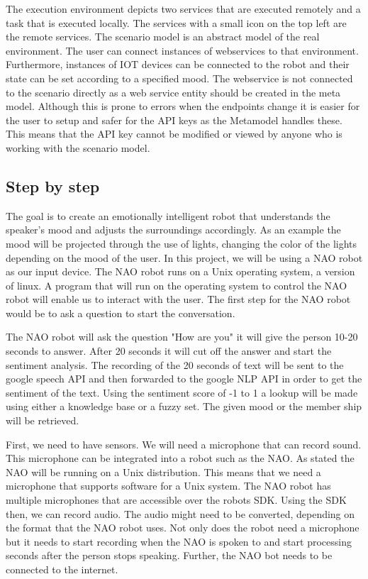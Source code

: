 \documentclass{lncs}
\begin{document}
The execution environment depicts two services that are executed remotely and a task that is executed locally. The services with a small icon on the top left are the remote services. The scenario model is an abstract model of the real environment. The user can connect instances of webservices to that environment. Furthermore, instances of IOT devices can be connected to the robot and their state can be set according to a specified mood. The webservice is not connected to the scenario directly as a web service entity should be created in the meta model. Although this is prone to errors when the endpoints change it is easier for the user to setup and safer for the API keys as the Metamodel handles these. This means that the API key cannot be modified or viewed by anyone who is working with the scenario model.

\subsection{Step by step}
The goal is to create an emotionally intelligent robot that understands the speaker's mood and adjusts the surroundings accordingly. As an example the mood will be projected through the use of lights, changing the color of the lights depending on the mood of the user. In this project, we will be using a NAO robot as our input device. The NAO robot runs on a Unix operating system, a version of linux. A program that will run on the operating system to control the NAO robot will enable us to interact with the user. The first step for the NAO robot would be to ask a question to start the conversation.

The NAO robot will ask the question "How are you" it will give the person 10-20 seconds to answer. After 20 seconds it will cut off the answer and start the sentiment analysis. The recording of the 20 seconds of text will be sent to the google speech API and then forwarded to the google NLP API in order to get the sentiment of the text. Using the sentiment score of -1 to 1 a lookup will be made using either a knowledge base or a fuzzy set. The given mood or the member ship will be retrieved.

First, we need to have sensors. We will need a microphone that can record sound. This microphone can be integrated into a robot such as the NAO. As stated the NAO will be running on a Unix distribution. This means that we need a microphone that supports software for a Unix system. The NAO robot has multiple microphones that are accessible over the robots SDK. Using the SDK then, we can record audio. The audio might need to be converted, depending on the format that the NAO robot uses. Not only does the robot need a microphone but it needs to start recording when the NAO is spoken to and start processing seconds after the person stops speaking. Further, the NAO bot needs to be connected to the internet.
\end{document}
